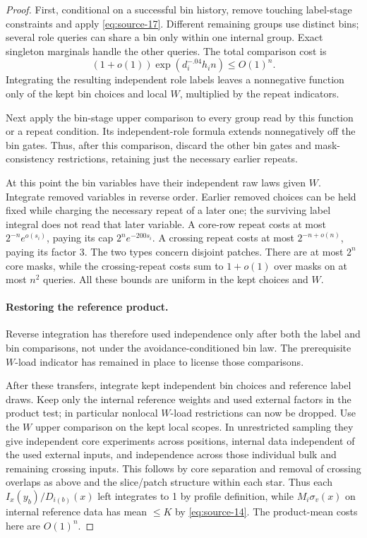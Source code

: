 \begin{proof}
First, conditional on a successful bin history, remove touching label-stage constraints and apply \eqref{eq:source-17}. Different remaining groups use distinct bins; several role queries can share a bin only within one internal group. Exact singleton marginals handle the other queries. The total comparison cost is
\[
 (1+o(1))\exp(d_i^{-.04}h_i n)\le O(1)^n.
\]
Integrating the resulting independent role labels leaves a nonnegative function only of the kept bin choices and local \(W\), multiplied by the repeat indicators.

Next apply the bin-stage upper comparison to every group read by this function or a repeat condition. Its independent-role formula extends nonnegatively off the bin gates. Thus, after this comparison, discard the other bin gates and mask-consistency restrictions, retaining just the necessary earlier repeats.

At this point the bin variables have their independent raw laws given \(W\). Integrate removed variables in reverse order. Earlier removed choices can be held fixed while charging the necessary repeat of a later one; the surviving label integral does not read that later variable. A core-row repeat costs at most \(2^{-n}e^{o(s_i)}\), paying its cap \(2^ne^{-200s_i}\). A crossing repeat costs at most \(2^{-n+o(n)}\), paying its factor 3. The two types concern disjoint patches. There are at most \(2^n\) core masks, while the crossing-repeat costs sum to \(1+o(1)\) over masks on at most \(n^2\) queries. All these bounds are uniform in the kept choices and \(W\).

\paragraph{Restoring the reference product.}
Reverse integration has therefore used independence only after both the label and bin comparisons, not under the avoidance-conditioned bin law. The prerequisite \(W\)-load indicator has remained in place to license those comparisons.

After these transfers, integrate kept independent bin choices and reference label draws. Keep only the internal reference weights and used external factors in the product test; in particular nonlocal \(W\)-load restrictions can now be dropped. Use the \(W\) upper comparison on the kept local scopes. In unrestricted sampling they give independent core experiments across positions, internal data independent of the used external inputs, and independence across those individual bulk and remaining crossing inputs. This follows by core separation and removal of crossing overlaps as above and the slice/patch structure within each star. Thus each \(I_x(y_b)/D_{i(b)}(x)\) left integrates to 1 by profile definition, while \(M_i\sigma_v(x)\) on internal reference data has mean \(\le K\) by \eqref{eq:source-14}. The product-mean costs here are \(O(1)^n\).


\end{proof}
